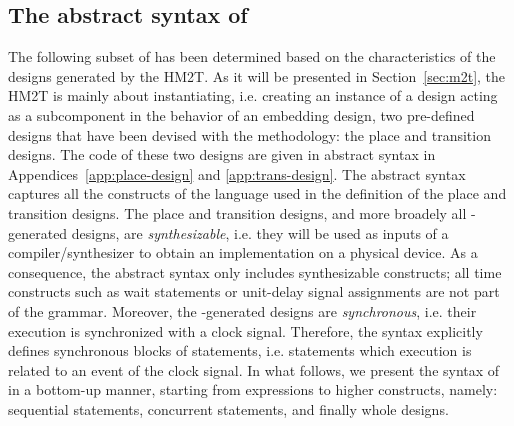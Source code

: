 \documentclass[pdflatex,sn-mathphys]{sn-jnl}%
\theoremstyle{thmstyleone}%
\theoremstyle{thmstyletwo}%
\theoremstyle{thmstylethree}%
\begin{document}
\subsection{The abstract syntax of \hvhdl{}}
\label{subsec:abs-syntax}

The following subset of \vhdl{} has been determined based on the
characteristics of the designs generated by the HM2T. As it will be
presented in Section~\ref{sec:m2t}, the HM2T is mainly about
instantiating, i.e. creating an instance of a design acting as a
subcomponent in the behavior of an embedding design, two pre-defined
designs that have been devised with the methodology: the place and
transition designs. The \vhdl{} code of these two designs are given in
abstract syntax in Appendices~\ref{app:place-design} and
\ref{app:trans-design}. The \hvhdl{} abstract syntax captures all the
constructs of the \vhdl{} language used in the definition of the place
and transition designs. The place and transition designs, and more
broadely all \hilecop{}-generated designs, are \textit{synthesizable},
i.e. they will be used as inputs of a compiler/synthesizer to obtain
an implementation on a physical device. As a consequence, the \hvhdl{}
abstract syntax only includes synthesizable constructs; all time
constructs such as wait statements or unit-delay signal assignments
are not part of the grammar. Moreover, the \hilecop{}-generated
designs are \textit{synchronous}, i.e. their execution is synchronized
with a clock signal. Therefore, the \hvhdl{} syntax explicitly defines
synchronous blocks of statements, i.e. statements which execution is
related to an event of the clock signal.  In what follows, we present
the syntax of \hvhdl{} in a bottom-up manner, starting from
expressions to higher constructs, namely: sequential statements,
concurrent statements, and finally whole designs.
\end{document}
